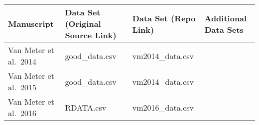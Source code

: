 \documentclass[
]{article}
\begin{document}
\begin{longtable}[]{@{}llll@{}}
\toprule
\begin{minipage}[b]{0.19\columnwidth}\raggedright
Manuscript\strut
\end{minipage} & \begin{minipage}[b]{0.24\columnwidth}\raggedright
Data Set (Original Source Link)\strut
\end{minipage} & \begin{minipage}[b]{0.22\columnwidth}\raggedright
Data Set (Repo Link)\strut
\end{minipage} & \begin{minipage}[b]{0.24\columnwidth}\raggedright
Additional Data Sets\strut
\end{minipage}\tabularnewline
\midrule
\endhead
\begin{minipage}[t]{0.19\columnwidth}\raggedright
Van Meter et al.~2014\strut
\end{minipage} & \begin{minipage}[t]{0.24\columnwidth}\raggedright
good\_data.csv\strut
\end{minipage} & \begin{minipage}[t]{0.22\columnwidth}\raggedright
vm2014\_data.csv\strut
\end{minipage} & \begin{minipage}[t]{0.24\columnwidth}\raggedright
\strut
\end{minipage}\tabularnewline
\begin{minipage}[t]{0.19\columnwidth}\raggedright
Van Meter et al.~2015\strut
\end{minipage} & \begin{minipage}[t]{0.24\columnwidth}\raggedright
good\_data.csv\strut
\end{minipage} & \begin{minipage}[t]{0.22\columnwidth}\raggedright
vm2014\_data.csv\strut
\end{minipage} & \begin{minipage}[t]{0.24\columnwidth}\raggedright
\strut
\end{minipage}\tabularnewline
\begin{minipage}[t]{0.19\columnwidth}\raggedright
Van Meter et al.~2016\strut
\end{minipage} & \begin{minipage}[t]{0.24\columnwidth}\raggedright
RDATA.csv\strut
\end{minipage} & \begin{minipage}[t]{0.22\columnwidth}\raggedright
vm2016\_data.csv\strut

\end{minipage}
\end{longtable}
\end{document}
